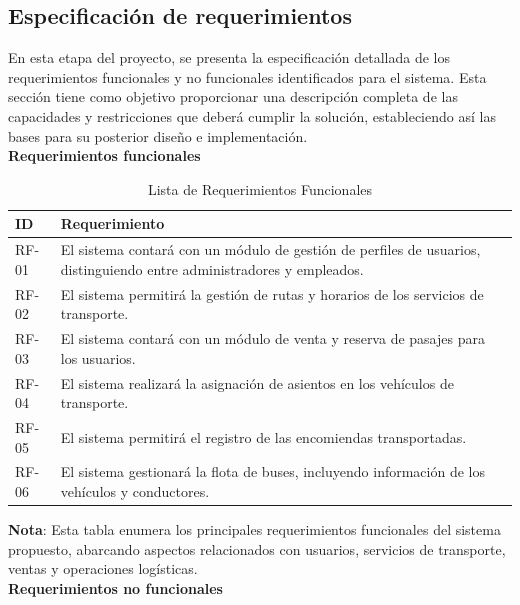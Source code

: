	\subsection{Especificación de requerimientos}
	En esta etapa del proyecto, se presenta la especificación detallada de los requerimientos funcionales y no funcionales identificados para el sistema. Esta sección tiene como objetivo proporcionar una descripción completa de las capacidades y restricciones que deberá cumplir la solución, estableciendo así las bases para su posterior diseño e implementación.\\	
	\textbf{Requerimientos funcionales}
	\begingroup
	\begin{longtable}{m{1.5cm}|m{14cm}}
		\caption[Lista de Requerimientos Funcionales]{\newline Lista de Requerimientos Funcionales} \label{tab:tabla_requerimientos_funcionales}\\
		\toprule
		\textbf{ID} & \textbf{Requerimiento} \\
		\midrule
		\endfirsthead		
		\bottomrule
		\endlastfoot
		
		RF-01 & El sistema contará con un módulo de gestión de perfiles de usuarios, distinguiendo entre administradores y empleados. \\
		RF-02 & El sistema permitirá la gestión de rutas y horarios de los servicios de transporte. \\
		RF-03 & El sistema contará con un módulo de venta y reserva de pasajes para los usuarios. \\
		RF-04 & El sistema realizará la asignación de asientos en los vehículos de transporte. \\
		RF-05 & El sistema permitirá el registro de las encomiendas transportadas. \\
		RF-06 & El sistema gestionará la flota de buses, incluyendo información de los vehículos y conductores. \\		
	\end{longtable}	
	\endgroup
	\vspace{-18pt}  %
	\textbf{Nota}: Esta tabla enumera los principales requerimientos funcionales del sistema propuesto, abarcando aspectos relacionados con usuarios, servicios de transporte, ventas y operaciones logísticas.\\		
	\textbf{Requerimientos no funcionales} \\	
	\begingroup
